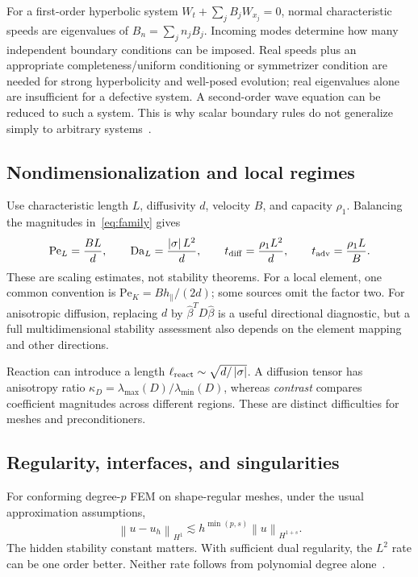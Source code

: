 \documentclass[11pt,a4paper]{article}
\newcommand{\norm}[1]{\left\lVert #1\right\rVert}
\newcommand{\abs}[1]{\left\lvert #1\right\rvert}
\begin{document}
For a first-order hyperbolic system $W_t+\sum_j B_jW_{x_j}=0$, normal characteristic speeds are eigenvalues of $B_n=\sum_jn_jB_j$. Incoming modes determine how many independent boundary conditions can be imposed. Real speeds plus an appropriate completeness/uniform conditioning or symmetrizer condition are needed for strong hyperbolicity and well-posed evolution; real eigenvalues alone are insufficient for a defective system. A second-order wave equation can be reduced to such a system. This is why scalar boundary rules do not generalize simply to arbitrary systems~\cite{leveque}.

\subsection{Nondimensionalization and local regimes}
Use characteristic length $L$, diffusivity $d$, velocity $B$, and capacity $\rho_1$. Balancing the magnitudes in~\eqref{eq:family} gives
\begin{equation}
\mathrm{Pe}_L=\frac{BL}{d},\qquad
\mathrm{Da}_L=\frac{\abs{\sigma}L^2}{d},\qquad
t_{\rm diff}=\frac{\rho_1L^2}{d},\qquad
t_{\rm adv}=\frac{\rho_1L}{B}.
\end{equation}
These are scaling estimates, not stability theorems. For a local element, one common convention is $\mathrm{Pe}_K=Bh_\parallel/(2d)$; some sources omit the factor two. For anisotropic diffusion, replacing $d$ by $\widehat\beta^TD\widehat\beta$ is a useful directional diagnostic, but a full multidimensional stability assessment also depends on the element mapping and other directions.

Reaction can introduce a length $\ell_{\rm react}\sim\sqrt{d/\abs{\sigma}}$. A diffusion tensor has anisotropy ratio $\kappa_D=\lambda_{\max}(D)/\lambda_{\min}(D)$, whereas \emph{contrast} compares coefficient magnitudes across different regions. These are distinct difficulties for meshes and preconditioners.

\subsection{Regularity, interfaces, and singularities}
For conforming degree-$p$ FEM on shape-regular meshes, under the usual approximation assumptions,
\begin{equation}\label{eq:regularity}
\norm{u-u_h}_{H^1}\lesssim h^{\min(p,s)}\norm{u}_{H^{1+s}}.
\end{equation}
The hidden stability constant matters. With sufficient dual regularity, the $L^2$ rate can be one order better. Neither rate follows from polynomial degree alone~\cite{femconvergence,ern2}.
\end{document}
